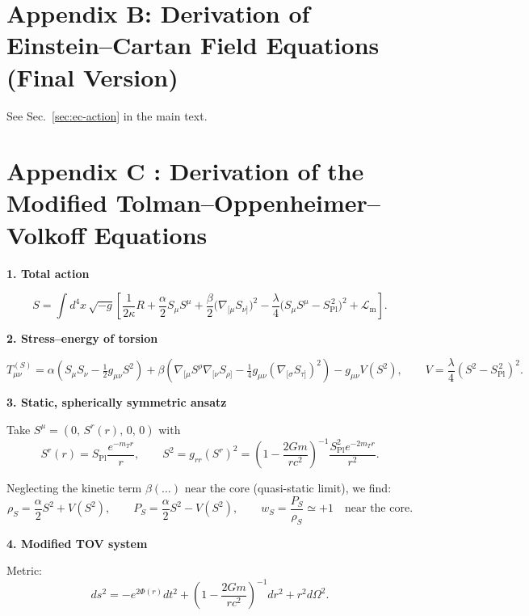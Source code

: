 \documentclass{article}
\newcommand{\Splanck}{S_{\mathrm{Pl}}}
\begin{document}
\section*{Appendix B: Derivation of Einstein--Cartan Field Equations (Final Version)}
\label{app:ec-derivation}
See Sec.~\ref{sec:ec-action} in the main text.









\section*{Appendix C : Derivation of the Modified Tolman--Oppenheimer--Volkoff Equations}
\label{app:tov-derivation}

\textbf{1. Total action}

\[
S = \int d^{4}x\,\sqrt{-g} \left[
 \frac{1}{2\kappa} R
 + \frac{\alpha}{2} S_\mu S^\mu
 + \frac{\beta}{2} \bigl(\nabla_{[\mu} S_{\nu]}\bigr)^2
 - \frac{\lambda}{4}\bigl(S_\mu S^\mu - \Splanck^{\,2} \bigr)^2
 + \mathcal{L}_{\mathrm{m}}
\right].
\]

\textbf{2. Stress--energy of torsion}

\[
T^{(S)}_{\mu\nu} =
 \alpha \left(S_\mu S_\nu - \tfrac{1}{2} g_{\mu\nu} S^{2} \right)
 + \beta \left( \nabla_{[\mu} S^{\rho} \nabla_{[\nu} S_{\rho]}
 - \tfrac{1}{4} g_{\mu\nu} (\nabla_{[\sigma} S_{\tau]})^{2} \right)
 - g_{\mu\nu} V(S^{2}),
\qquad
V = \frac{\lambda}{4}(S^{2} - \Splanck^{\,2})^{2}.
\]

\textbf{3. Static, spherically symmetric ansatz}

Take $S^\mu = (0,\, S^r(r),\, 0,\, 0)$ with
\[
S^r(r) = \Splanck \frac{e^{-m_T r}}{r}, \qquad
S^{2} = g_{rr} (S^r)^2 = \left(1 - \frac{2Gm}{rc^2}\right)^{-1} \frac{\Splanck^2 e^{-2m_T r}}{r^2}.
\]

Neglecting the kinetic term $\beta(\dots)$ near the core (quasi-static limit), we find:
\[
\rho_S = \frac{\alpha}{2} S^2 + V(S^2),
\qquad
P_S = \frac{\alpha}{2} S^2 - V(S^2),
\qquad
w_S = \frac{P_S}{\rho_S} \simeq +1 \quad \text{near the core}.
\]

\textbf{4. Modified TOV system}

Metric:
\[
ds^2 = -e^{2\Phi(r)} dt^2 + \left(1 - \frac{2Gm}{rc^2}\right)^{-1} dr^2 + r^2 d\Omega^2.
\]
\end{document}

